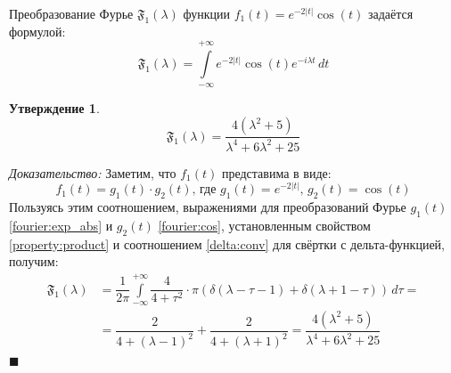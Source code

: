 \documentclass[11pt, oneside, draft]{article}
\numberwithin{equation}{section}
\newtheorem*{statement}{Утверждение}
\renewenvironment{proof}{
\noindent\textit{Доказательство: }} {\qed}
\newcommand \intinf[1][{\,dt}]{ \int\limits_{-\infty}^{+\infty}{{#1}}}
\renewcommand \qed{$\blacksquare$}
\begin{document}
    Преобразование Фурье \( \mathfrak{F_1} (\lambda)\) функции \(f_1(t) = e^{-2|t|} \cos(t) \) задаётся формулой:
    \[ \mathfrak{F_1} (\lambda) = \intinf[{e^{-2|t|} \cos(t) e^{-i\lambda t}\, dt}] \]
    \begin{statement}
        \begin{equation}\label{fourier_transform:f1} 
            \boxed{ \mathfrak{F_1}(\lambda) = \dfrac{4(\lambda^2 + 5)}{\lambda^4 + 6\lambda^2 + 25} } 
        \end{equation}
    \end{statement}
    \begin{proof}
        Заметим, что \(f_1(t) \) представима в виде: 
        \begin{equation}\label{factor:f1} 
            f_1(t) = g_1(t) \cdot g_2(t) \text{, где }g_1(t) = e^{-2|t|},\,g_2(t) = \cos(t) 
        \end{equation}
        Пользуясь этим соотношением, выражениями для преобразований Фурье \(g_1(t)\) \eqref{fourier:exp_abs} и \(g_2(t)\) \eqref{fourier:cos}, установленным свойством \ref{property:product} и соотношением \eqref{delta:conv} для свёртки с дельта-функцией, получим:
        \[ 
        \begin{split}
            \mathfrak{F_1} (\lambda) &= \dfrac{1}{2\pi} \intinf[{\dfrac{4}{4 + \tau^2} \cdot \pi(\delta(\lambda - \tau- 1) + \delta(\lambda + 1 - \tau))\,d\tau}] = \\
            &=\dfrac{2}{4 + (\lambda - 1)^2} + \dfrac{2}{4 + (\lambda + 1)^2} = \dfrac{4(\lambda^2 + 5)}{\lambda^4 + 6\lambda^2 + 25} 
        \end{split}
        \]
    \end{proof}

\end{document}
